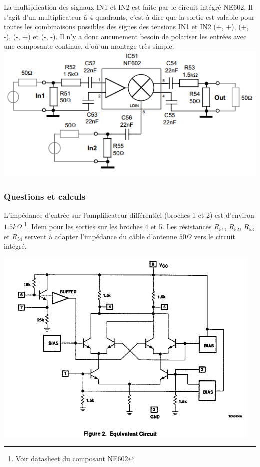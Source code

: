 \documentclass{article}
\begin{document}
La multiplication des signaux IN1 et IN2 est faite par le circuit intégré NE602. 
Il s'agit d'un multiplicateur à 4 quadrants, c'est à dire que la sortie est valable pour toutes les combinaisons possibles des signes des tensions IN1 et IN2 (+, +), (+, -), (-, +) et (-, -).
Il n'y a donc aucunement besoin de polariser les entrées avec une composante continue, d'où un montage très simple.\\

\includegraphics{shema_melangeur_gilbert.png}

\subsubsection{Questions et calculs}


L'impédance d'entrée sur l'amplificateur différentiel (broches 1 et 2) est d'environ $1.5k\Omega$ \footnote{Voir datasheet du composant NE602}. Idem pour les sorties sur les broches 4 et 5.
Les résistances $R_{51}$, $R_{52}$, $R_{53}$ et $R_{54}$ servent à adapter l'impédance du câble d'antenne $50\Omega$ vers le circuit intégré.\\

\begin{center}
\includegraphics[width=0.85\linewidth]{shema_interne_ne602.png}
\end{center}
\end{document}
